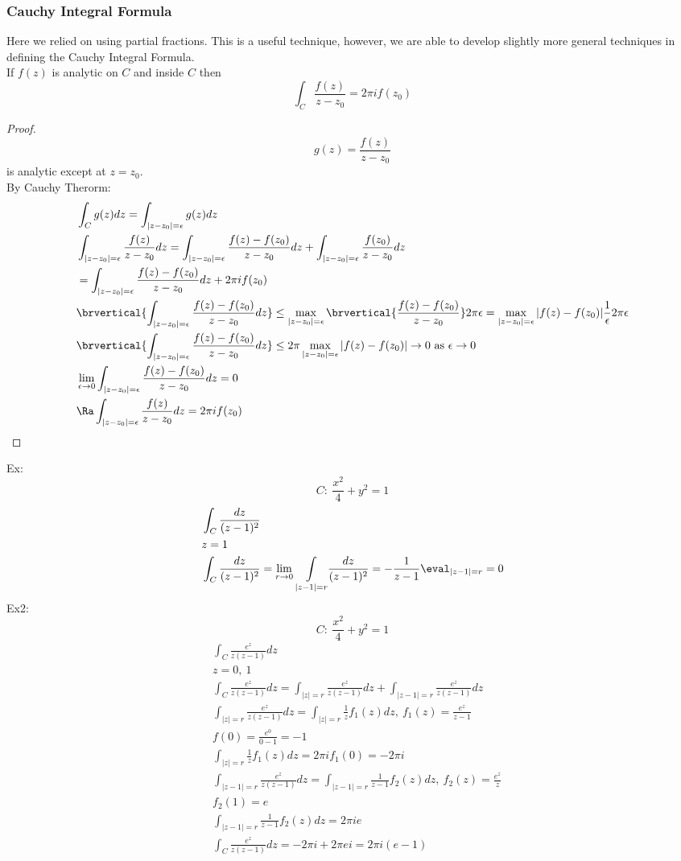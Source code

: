 \subsubsection{Cauchy Integral Formula}
Here we relied on using partial fractions. This is a useful technique, however, we are able to develop slightly more general techniques in defining the Cauchy Integral Formula.\\
If $f(z)$ is analytic on $C$ and inside $C$ then
\[\int_C\frac{f(z)}{z-z_0}=2\pi if(z_0)\]
\begin{proof}
\[g(z)=\frac{f(z)}{z-z_0}\]
is analytic except at $z=z_0$.\\
By Cauchy Therorm:
\begin{align*}
    &\int_Cg(z)dz=\int_{|z-z_0|=\epsilon}g(z)dz\\
    &\int_{|z-z_0|=\epsilon}\frac{f(z)}{z-z_0}dz=\int_{|z-z_0|=\epsilon}\frac{f(z)-f(z_0)}{z-z_0}dz+\int_{|z-z_0|=\epsilon}\frac{f(z_0)}{z-z_0}dz\\
    &=\int_{|z-z_0|=\epsilon}\frac{f(z)-f(z_0)}{z-z_0}dz+2\pi if(z_0)\\
    &\brvertical{\int_{|z-z_0|=\epsilon}\frac{f(z)-f(z_0)}{z-z_0}dz}\leq\max_{|z-z_0|=\epsilon}\brvertical{\frac{f(z)-f(z_0)}{z-z_0}}2\pi\epsilon=\max_{|z-z_0|=\epsilon}|f(z)-f(z_0)|\frac{1}{\epsilon}2\pi\epsilon\\
    &\brvertical{\int_{|z-z_0|=\epsilon}\frac{f(z)-f(z_0)}{z-z_0}dz}\leq2\pi\max_{|z-z_0|=\epsilon}|f(z)-f(z_0)|\to0\text{ as $\epsilon\to0$}\\
    &\lim_{\epsilon\to0}\int_{|z-z_0|=\epsilon}\frac{f(z)-f(z_0)}{z-z_0}dz=0\\
    &\Ra \int_{|z-z_0|=\epsilon}\frac{f(z)}{z-z_0}dz=2\pi if(z_0)
\end{align*}
\end{proof}
Ex:
\[
C:\ \frac{x^2}{4}+y^2=1
\]
\begin{align*}
    &\int_C\frac{dz}{(z-1)^2}\\
    &z=1\\
    &\int_C\frac{dz}{(z-1)^2}=\lim_{r\to0}\underset{|z-1|=r}{\int}\frac{dz}{(z-1)^2}=-\frac{1}{z-1}\eval_{|z-1|=r}=0
\end{align*}
Ex2:
\[
C:\ \frac{x^2}{4}+y^2=1
\]
\begin{align*}
    &\int_C\frac{e^z}{z(z-1)}dz\\
    &z=0,\ 1\\
    &\int_C\frac{e^z}{z(z-1)}dz=\int_{|z|=r}\frac{e^z}{z(z-1)}dz+\int_{|z-1|=r}\frac{e^z}{z(z-1)}dz\\
    &\int_{|z|=r}\frac{e^z}{z(z-1)}dz=\int_{|z|=r}\frac{1}{z}f_1(z)dz,\ f_1(z)=\frac{e^z}{z-1}\\
    &f(0)=\frac{e^0}{0-1}=-1\\
    &\int_{|z|=r}\frac{1}{z}f_1(z)dz=2\pi if_1(0)=-2\pi i\\
    &\int_{|z-1|=r}\frac{e^z}{z(z-1)}dz=\int_{|z-1|=r}\frac{1}{z-1}f_2(z)dz,\ f_2(z)=\frac{e^z}{z}\\
    &f_2(1)=e\\
    &\int_{|z-1|=r}\frac{1}{z-1}f_2(z)dz=2\pi ie\\
    &\int_C\frac{e^z}{z(z-1)}dz=-2\pi i+2\pi ei=2\pi i(e-1)
\end{align*}
